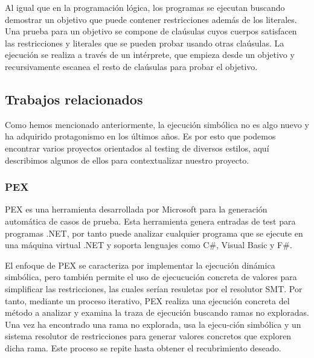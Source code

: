 Al igual que en la programaci\'on l\'ogica, los programas se ejecutan buscando demostrar un objetivo que puede contener restricciones adem\'as de los literales. Una prueba para un objetivo se compone de cla\'usulas cuyos cuerpos satisfacen las restricciones y literales que se pueden probar usando otras cla\'usulas. La ejecuci\'on se realiza a trav\'es de un int\'erprete, que empieza desde un objetivo y recursivamente escanea el resto de cla\'usulas para probar el objetivo.

\subsection{Trabajos relacionados}

Como hemos mencionado anteriormente, la ejecuci\'on simb\'olica no es algo nuevo y ha adquirido protagonismo en los \'ultimos a\~nos. Es por esto que podemos encontrar varios proyectos orientados al testing de diversos estilos, aqu\'i describimos algunos de ellos para contextualizar nuestro proyecto.

\subsubsection{PEX}

PEX es una herramienta desarrollada por Microsoft para la generaci\'on autom\'atica de casos de prueba. Esta herramienta genera entradas de test para programas .NET, por tanto puede analizar cualquier programa que se ejecute en una m\'aquina virtual .NET y soporta lenguajes como C\#, Visual Basic y F\#.

El enfoque de PEX se caracteriza por implementar la ejecuci\'on din\'amica simb\'olica, pero tambi\'en permite el uso de ejecucuci\'on concreta de valores para simplificar las restricciones, las cuales ser\'ian resuletas por el resolutor SMT. Por tanto, mediante un proceso iterativo, PEX realiza una ejecuci\'on concreta del m\'etodo a analizar y examina la traza de ejecuci\'on buscando ramas no exploradas. Una vez ha encontrado una rama no explorada, usa la ejecu-ci\'on simb\'olica y un sistema resolutor de restricciones para generar valores concretos que exploren dicha rama. Este proceso se repite hasta obtener el recubrimiento deseado.

